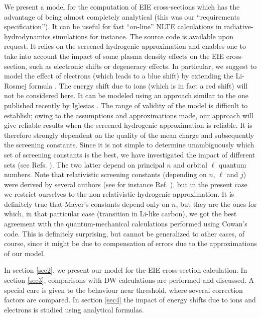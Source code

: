\documentclass[a4paper,10pt]{article}
\begin{document}
We present a model for the computation of EIE cross-sections which has the advantage of being almost completely analytical (this was our ``requirements specification''). It can be useful for fast ``on-line'' NLTE calculations in radiative-hydrodynamics simulations for instance. The source code is available upon request. It relies on the screened hydrogenic approximation and enables one to take into account the impact of some plasma density effects on the EIE cross-section, such as electronic shifts or degeneracy effects. In particular, we suggest to model the effect of electrons (which leads to a blue shift) by extending the Li-Rosmej formula \cite{ROSMEJ11,LI12,IGLESIAS19a,PAIN19}. The energy shift due to ions (which is in fact a red shift) will not be considered here. It can be modeled using an approach similar to the one published recently by Iglesias \cite{IGLESIAS19a}. The range of validity of the model is difficult to establish; owing to the  assumptions and approximations made, our approach will give reliable results when the screened hydrogenic approximation is reliable. It is therefore strongly dependent on the quality of the mean charge and subsequently the screening constants. Since it is not simple to determine unambiguously which set of screening constants is the best, we have investigated the impact of different sets (see  Refs. \cite{MAYER47,FAUSSURIER97,SMITH11}). The two latter depend on principal $n$ and orbital $\ell$ quantum numbers. Note that relativistic screening constants (depending on $n$, $\ell$ and $j$) were derived by several authors (see for instance Ref. \cite{mendoza11}), but in the present case we restrict ourselves to the non-relativistic hydrogenic approximation. It is definitely true that Mayer's constants \cite{MAYER47} depend only on $n$, but they are the ones for which, in that particular case (transition in Li-like carbon), we got the best agreement with the quantum-mechanical calculations performed using Cowan's code. This is definitely surprising, but cannot be generalized to other cases, of course, since it might be due to compensation of errors due to the approximations of our model.

In section \ref{sec2}, we present our model for the EIE cross-section calculation. In section \ref{sec3}, comparisons with DW calculations are performed and discussed. A special care is given to the behaviour near threshold, where several correction factors are compared. In section \ref{sec4} the impact of energy shifts due to ions and electrons is studied using analytical formulas.
\end{document}
